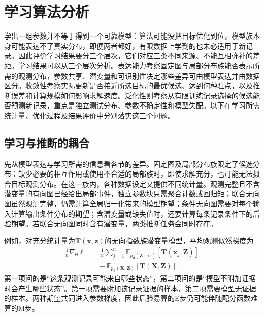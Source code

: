 \section{学习算法分析}
\label{sec:pgm-parameter-learning-analysis}

学出一组参数并不等于得到一个可靠模型：算法可能没把目标优化到位，模型族本身可能表达不了真实分布，即便两者都好，有限数据上学到的也未必适用于新记录。因此评价学习结果要分三个层次，它们对应三类不同来源、不能互相弥补的差距。学习结果可以从三个层次分析。表达能力考察固定图与局部分布族能否表示所需的观测分布，参数共享、潜变量和可识别性决定哪些差异可由模型表达并由数据区分。收敛性考察实际更新是否接近所选目标的最优候选、达到何种驻点，以及推断误差和计算规模如何影响求解速度。泛化性则考察从有限训练记录选择的候选能否预测新记录，重点是独立测试分布、参数不确定性和模型失配。以下在学习所需统计量、优化过程及结果评价中分别落实这三个问题。

\subsection{学习与推断的耦合}
\label{sec:pgm-parameter-learning-inference-coupling}

先从模型表达与学习所需的信息看各节的差异。固定图及局部分布族限定了候选分布：缺少必要的相互作用或使用不合适的局部族时，即使求解充分，也可能无法拟合目标观测分布。在这一族内，各种数据设定又提供不同统计量。观测完整且不含潜变量的有向图已经给出局部事件，独立参数块只需聚合计数或回归矩；联合无向图虽然观测完整，仍需计算全局归一化带来的模型期望；条件无向图需要对每个输入计算输出条件分布的期望；含潜变量或缺失值时，还要计算每条记录条件下的后验期望。若联合无向图同时含有潜变量，两类推断任务会同时存在。

例如，对充分统计量为$\bm{T}(\bm{x},\bm{z})$的无向指数族潜变量模型，平均观测似然梯度为
\begin{equation}
  \begin{aligned}
    \frac{1}{n}\nabla_{\bm{\theta}}\ell
      &=\frac{1}{n}\sum_{j=1}^n
        \mathbb{E}_{p_{\bm{\theta}}(\bm{Z}\mid\bm{x}_j)}
          [\bm{T}(\bm{x}_j,\bm{Z})]\\
      &\quad-\mathbb{E}_{p_{\bm{\theta}}(\bm{X},\bm{Z})}
          [\bm{T}(\bm{X},\bm{Z})].
  \end{aligned}
  \label{eq:pgm-parameter-learning-two-expectations}
\end{equation}
第一项问的是“这条观测记录可能来自哪些状态”，第二项问的是“模型不附加证据时会产生哪些状态”。第一项需要附加该记录证据的样本，第二项需要模型无证据的样本。两种期望共同进入参数梯度，因此后验易算的E步仍可能伴随配分函数难算的M步。

